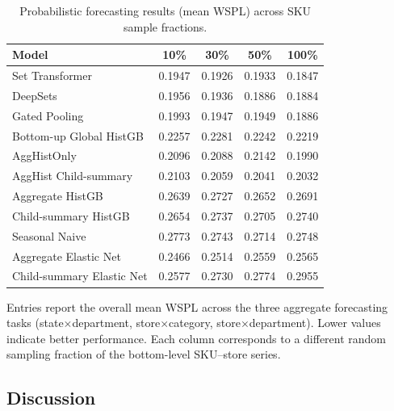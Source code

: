 \documentclass[12pt]{article}
\begin{document}
\begin{table}[H]
  \centering
  \caption{Probabilistic forecasting results (mean WSPL) across SKU sample fractions.}
  \label{tab:summary_quantile_sample_frac}
  \begin{threeparttable}
    \begin{tabular}{lcccc}
      \toprule
      Model                     & 10\%                & 30\%                & 50\%                & 100\%               \\
      \midrule
      Set Transformer                & 0.1947 & 0.1926 & 0.1933 & 0.1847 \\
      DeepSets                       & 0.1956 & 0.1936 & 0.1886 & 0.1884 \\
      Gated Pooling                  & 0.1993 & 0.1947 & 0.1949 & 0.1886 \\
      Bottom-up Global HistGB        & 0.2257 & 0.2281 & 0.2242 & 0.2219 \\
      AggHistOnly                    & 0.2096 & 0.2088 & 0.2142 & 0.1990 \\
      AggHist Child-summary          & 0.2103 & 0.2059 & 0.2041 & 0.2032 \\
      Aggregate HistGB               & 0.2639 & 0.2727 & 0.2652 & 0.2691 \\
      Child-summary HistGB           & 0.2654 & 0.2737 & 0.2705 & 0.2740 \\
      Seasonal Naive                 & 0.2773 & 0.2743 & 0.2714 & 0.2748 \\
      Aggregate Elastic Net          & 0.2466 & 0.2514 & 0.2559 & 0.2565 \\
      Child-summary Elastic Net      & 0.2577 & 0.2730 & 0.2774 & 0.2955 \\
      \bottomrule
    \end{tabular}
    \begin{tablenotes}
      \footnotesize \item Entries report the overall mean WSPL across the three aggregate forecasting tasks (state$\times$department, store$\times$category, store$\times$department). Lower values indicate better performance. Each column corresponds to a different random sampling fraction of the bottom-level SKU--store series.
    \end{tablenotes}
  \end{threeparttable}
\end{table}


\subsection{Discussion}
\end{document}
